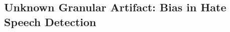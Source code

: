 \documentclass[11pt]{article}
\begin{document}

\subsection{Unknown Granular Artifact: Bias in Hate Speech Detection}%
\end{document}
